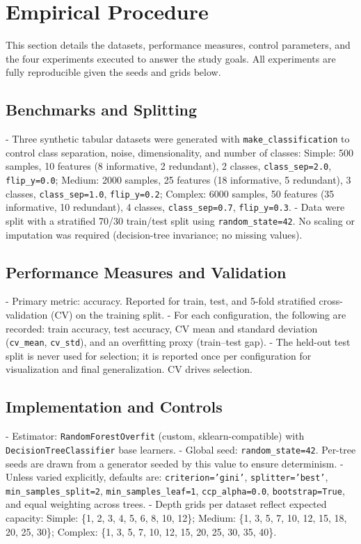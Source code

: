 \documentclass[conference]{IEEEtran}
\begin{document}
\section{Empirical Procedure}

This section details the datasets, performance measures, control parameters, and the four experiments executed to answer the study goals. All experiments are fully reproducible given the seeds and grids below.

\subsection{Benchmarks and Splitting}
- Three synthetic tabular datasets were generated with \texttt{make\_classification} to control class separation, noise, dimensionality, and number of classes: 
  Simple: 500 samples, 10 features (8 informative, 2 redundant), 2 classes, \texttt{class\_sep=2.0}, \texttt{flip\_y=0.0}; 
  Medium: 2000 samples, 25 features (18 informative, 5 redundant), 3 classes, \texttt{class\_sep=1.0}, \texttt{flip\_y=0.2}; 
  Complex: 6000 samples, 50 features (35 informative, 10 redundant), 4 classes, \texttt{class\_sep=0.7}, \texttt{flip\_y=0.3}. 
- Data were split with a stratified 70/30 train/test split using \texttt{random\_state=42}. No scaling or imputation was required (decision-tree invariance; no missing values).

\subsection{Performance Measures and Validation}
- Primary metric: accuracy. Reported for train, test, and 5-fold stratified cross-validation (CV) on the training split. 
- For each configuration, the following are recorded: train accuracy, test accuracy, CV mean and standard deviation (\texttt{cv\_mean}, \texttt{cv\_std}), and an overfitting proxy (train–test gap).
- The held-out test split is never used for selection; it is reported once per configuration for visualization and final generalization. CV drives selection.

\subsection{Implementation and Controls}
- Estimator: \texttt{RandomForestOverfit} (custom, sklearn-compatible) with \texttt{DecisionTreeClassifier} base learners.
- Global seed: \texttt{random\_state=42}. Per-tree seeds are drawn from a generator seeded by this value to ensure determinism.
- Unless varied explicitly, defaults are: \texttt{criterion='gini'}, \texttt{splitter='best'}, \texttt{min\_samples\_split=2}, \texttt{min\_samples\_leaf=1}, \texttt{ccp\_alpha=0.0}, \texttt{bootstrap=True}, and equal weighting across trees.
- Depth grids per dataset reflect expected capacity: 
  Simple: \{1, 2, 3, 4, 5, 6, 8, 10, 12\}; 
  Medium: \{1, 3, 5, 7, 10, 12, 15, 18, 20, 25, 30\}; 
  Complex: \{1, 3, 5, 7, 10, 12, 15, 20, 25, 30, 35, 40\}.
\end{document}
